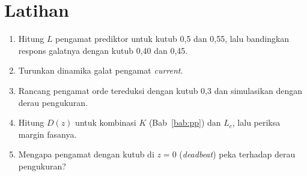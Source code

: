 \section*{Latihan}
\begin{enumerate}
	\item Hitung $L$ pengamat prediktor untuk kutub 0,5 dan 0,55, lalu bandingkan respons galatnya dengan kutub 0,40 dan 0,45.
	\item Turunkan dinamika galat pengamat \textit{current}.
	\item Rancang pengamat orde tereduksi dengan kutub 0,3 dan simulasikan dengan derau pengukuran.
	\item Hitung $D(z)$ untuk kombinasi $K$ (Bab~\ref{bab:pp}) dan $L_c$, lalu periksa margin fasanya.
	\item Mengapa pengamat dengan kutub di $z = 0$ (\textit{deadbeat}) peka terhadap derau pengukuran?
\end{enumerate}
